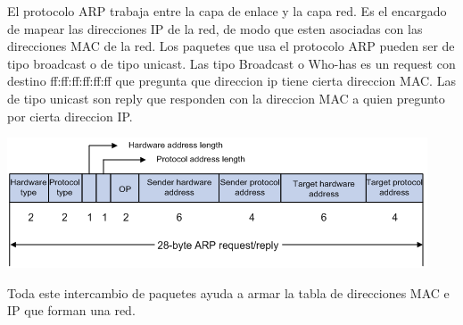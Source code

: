 El protocolo ARP trabaja entre la capa de enlace y la capa red. Es el encargado de mapear las direcciones IP de la red, de modo que esten asociadas con las direcciones MAC de la red.
Los paquetes que usa el protocolo ARP pueden ser de tipo broadcast o de tipo unicast. Las tipo Broadcast o Who-has es un request con destino ff:ff:ff:ff:ff:ff que pregunta que direccion ip tiene cierta direccion MAC. Las de tipo unicast son reply que responden con la direccion MAC a quien pregunto por cierta direccion IP.

\includegraphics[scale=0.8]{arp.png}

Toda este intercambio de paquetes ayuda a armar la tabla de direcciones MAC e IP que forman una red.
   
